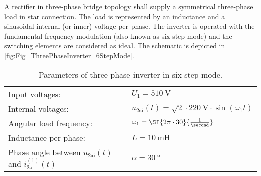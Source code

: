 

 



\newpage



A rectifier in three-phase bridge topology shall supply a
symmetrical three-phase load in star connection. The load is represented by an inductance and 
a sinusoidal internal (or inner) voltage per phase. The inverter is operated with the fundamental 
frequency modulation (also known as six-step mode) and the switching elements are considered as ideal. 
The schematic is depicted in \autoref{fig:Fig_ThreePhaseInverter_6StepMode}.



\begin{table}[ht]
    \centering  %
    \begin{tabular}{ll}
        \toprule
        Input voltages: & $U_\mathrm{1}=\SI{510}{\volt}$ \\
        Internal voltages: & $u_{\mathrm{2ai}}(t) = \sqrt{2} \cdot \SI{220}{\volt} \cdot \sin(\omega_1t)$ \\
        Angular load frequency: & $\omega_1 = \SI{2 \pi \cdot 30}{\frac{1}{\second}}$ \\ 
        Inductance per phase: & $L= \SI{10}{\milli \henry}$ \\
        Phase angle between  $u_{\mathrm{2ai}}(t)$ and $i_{\mathrm{2ai}}^\mathrm{(1)}(t)$ & $\alpha=\SI{30}{\degree}$ \\
        \bottomrule
    \end{tabular}
    \caption{Parameters of three-phase inverter in six-step mode.}  
    \label{table:ex07_Task2_ParametersOfTheCircuit}
\end{table}

